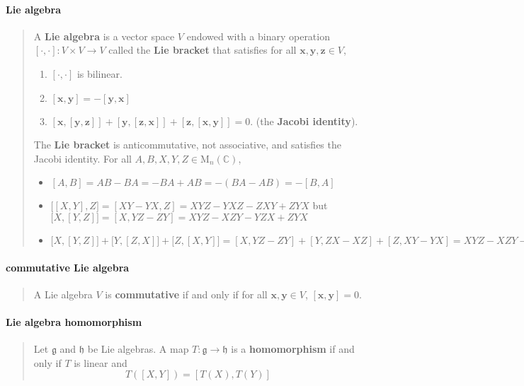 \documentclass[letterpaper, 10pt]{article}
\theoremstyle{theostyle}
\begin{document}
\paragraph{Lie algebra}
\begin{quote}
    A \textbf{Lie algebra} is a vector space \(V\) endowed with a binary operation \(\left[ \cdot , \cdot \right] : V \times V \rightarrow V\)
    called the \textbf{Lie bracket} that satisfies for all \(\mathbf{x}, \mathbf{y}, \mathbf{z} \in V\),
    \begin{enumerate}
        \item \(\left[ \cdot , \cdot \right]\) is bilinear.
        \item \(\left[ \mathbf{x} , \mathbf{y} \right] = - \left[ \mathbf{y} , \mathbf{x} \right]\)
        \item \(\left[ \mathbf{x} , \left[\mathbf{y} , \mathbf{z} \right] \right] + \left[ \mathbf{y} , \left[\mathbf{z} , \mathbf{x} \right] \right] + \left[ \mathbf{z} , \left[\mathbf{x} , \mathbf{y} \right] \right] = 0\).
        (the \textbf{Jacobi identity}).
    \end{enumerate}

    The \textbf{Lie bracket} is anticommutative, not associative, and satisfies the Jacobi identity.
    For all \(A,B,X,Y,Z \in \mathrm{M}_n(\mathbb{C})\),
    \begin{itemize}
        \item \([A,B] = AB - BA = -BA + AB = -(BA - AB) = -[B,A]\)
        \item \(\bigl[[X,Y],Z\bigr] = [XY-YX,Z] = XYZ-YXZ-ZXY+ZYX\) but \(\bigl[X,[Y,Z]\bigr] = [X,YZ-ZY] = XYZ - XZY - YZX + ZYX\)
        \item \(\bigl[X,[Y,Z]\bigr] + \bigl[Y,[Z,X]\bigr] + \bigl[Z,[X,Y]\bigr] = [X, YZ - ZY] + [Y, ZX-XZ] + [Z, XY-YX] = 
        XYZ-XZY-YZX+ZYX+YZX-YXZ-ZXY+XZY+ZXY-ZYX-XYZ+YXZ = 0\)
    \end{itemize}
\end{quote}

\paragraph{commutative Lie algebra}
\begin{quote}
    A Lie algebra \(V\) is \textbf{commutative} if and only if for all \(\mathbf{x}, \mathbf{y} \in V\), \(\left[\mathbf{x} , \mathbf{y}\right] = 0\).
\end{quote}

\paragraph{Lie algebra homomorphism}
\begin{quote}
    Let \(\mathfrak{g}\) and \(\mathfrak{h}\) be Lie algebras.
    A map \(T : \mathfrak{g} \rightarrow \mathfrak{h}\) is a \textbf{homomorphism} if and only if \(T\) is linear and 
    \[T\left(\left[X,Y\right]\right) = \left[T(X),T(Y)\right]\]
\end{quote}
\end{document}
